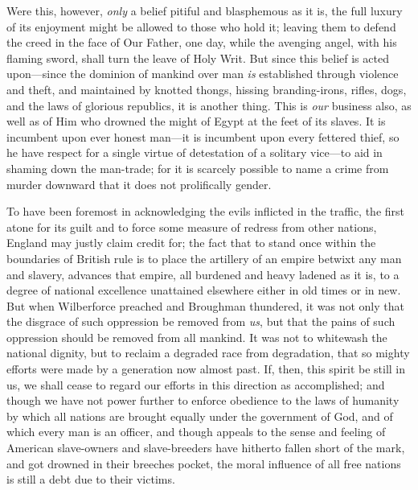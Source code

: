 Were this, however, \emph{only} a belief pitiful and blasphemous as it is, the
full luxury of its enjoyment might be allowed to those who hold it; leaving
them to defend the creed in the face of Our Father, one day, while the avenging
angel, with his flaming sword, shall turn the leave of Holy Writ. But since this
belief is acted upon---since the dominion of mankind over man \emph{is}
established through violence and theft, and maintained by knotted thongs,
hissing branding-irons, rifles, dogs, and the laws of glorious republics, it is
another thing. This is \emph{our} business also, as well as of Him who drowned
the might of Egypt at the feet of its slaves. It is incumbent upon ever honest
man---it is incumbent upon every fettered thief, so he have respect for a single
virtue of detestation of a solitary vice---to aid in shaming down the man-trade;
for it is scarcely possible to name a crime from murder downward that it does
not prolifically gender.

To have been foremost in acknowledging the evils inflicted in the traffic, the
first atone for its guilt and to force some measure of redress from other
nations, England may justly claim credit for; the fact that to stand once within
the boundaries of British rule is to place the artillery of an empire betwixt
any man and slavery, advances that empire, all burdened and heavy ladened as it
is, to a degree of national excellence unattained elsewhere either in old times
or in new. But when Wilberforce preached and Broughman thundered, it was not
only that the disgrace of such oppression be removed from \emph{us}, but that
the pains of such oppression should be removed from all mankind. It was not to
whitewash the national dignity, but to reclaim a degraded race from degradation,
that so mighty efforts were made by a generation now almost past. If, then, this
spirit be still in us, we shall cease to regard our efforts in this direction as
accomplished; and though we have not power further to enforce obedience to the
laws of humanity by which all nations are brought equally under the government
of God, and of which every man is an officer, and though appeals to the sense
and feeling of American slave-owners and slave-breeders have hitherto fallen
short of the mark, and got drowned in their breeches pocket, the moral influence
of all free nations is still a debt due to their victims.

